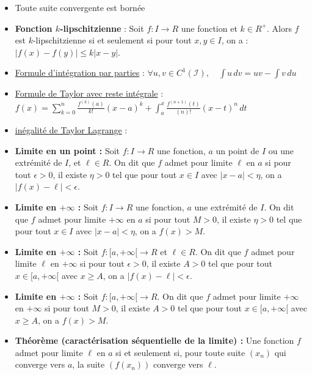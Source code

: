 \documentclass{article}
\begin{document}
\begin{itemize}[label=$\ast$]
	\item Toute suite convergente est bornée
	\item \textbf{Fonction \( k \)-lipschitzienne} : Soit \( f: I \to R \) une fonction et \( k \in R^+ \). Alors \( f \) est \( k \)-lipschitzienne si et seulement si pour tout \( x, y \in I \), on a : \( |f(x) - f(y)| \leq k |x - y| \).
	\item \underline{Formule d'intégration par parties} : \( \forall u, v \in C^1(\mathcal{I}), \quad \int u \, dv = uv - \int v \, du \)
	\item \underline{Formule de Taylor avec reste intégrale} : \( f(x) = \sum_{k=0}^{n} \frac{f^{(k)}(a)}{k!}(x-a)^k + \int_{a}^{x} \frac{f^{(n+1)}(t)}{(n)!}(x-t)^{n} \, dt \)
	\item \underline{inégalité de Taylor Lagrange} : 
	\item \textbf{Limite en un point :} Soit \( f: I \rightarrow R \) une fonction, \( a \) un point de \( I \) ou une extrémité de \( I \), et \( \ell \in R \). On dit que \( f \) admet pour limite \( \ell \) en \( a \) si pour tout \( \epsilon > 0 \), il existe \( \eta > 0 \) tel que pour tout \( x \in I \) avec \( |x - a| < \eta \), on a \( |f(x) - \ell| < \epsilon \).

	\item \textbf{Limite en \( +\infty \) :} Soit \( f: I \rightarrow R \) une fonction, \( a \) une extrémité de \( I \). On dit que \( f \) admet pour limite \( +\infty \) en \( a \) si pour tout \( M > 0 \), il existe \( \eta > 0 \) tel que pour tout \( x \in I \) avec \( |x - a| < \eta \), on a \( f(x) > M \).

	\item \textbf{Limite en \( +\infty \) :} Soit \( f: [a, +\infty[ \rightarrow R \) et \( \ell \in R \). On dit que \( f \) admet pour limite \( \ell \) en \( +\infty \) si pour tout \( \epsilon > 0 \), il existe \( A > 0 \) tel que pour tout \( x \in [a, +\infty[ \) avec \( x \geq A \), on a \( |f(x) - \ell| < \epsilon \).

	\item \textbf{Limite en \( +\infty \) :} Soit \( f: [a, +\infty[ \rightarrow R \). On dit que \( f \) admet pour limite \( +\infty \) en \( +\infty \) si pour tout \( M > 0 \), il existe \( A > 0 \) tel que pour tout \( x \in [a, +\infty[ \) avec \( x \geq A \), on a \( f(x) > M \).

	\item \textbf{Théorème (caractérisation séquentielle de la limite) :} 
Une fonction \( f \) admet pour limite \( \ell \) en \( a \) si et seulement si, pour toute suite \( (x_n) \) qui converge vers \( a \), la suite \( (f(x_n)) \) converge vers \( \ell \).


\end{itemize}
\end{document}
